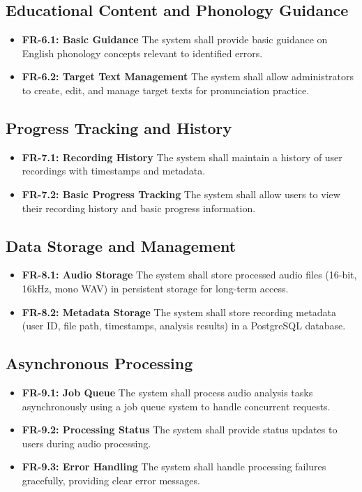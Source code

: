 \documentclass[a4paper,12pt]{report}
\begin{document}
\subsection{Educational Content and Phonology Guidance}
\begin{itemize}
    \item \textbf{FR-6.1: Basic Guidance} The system shall provide basic guidance on English phonology concepts relevant to identified errors.
    \item \textbf{FR-6.2: Target Text Management} The system shall allow administrators to create, edit, and manage target texts for pronunciation practice.
\end{itemize}

\subsection{Progress Tracking and History}
\begin{itemize}
    \item \textbf{FR-7.1: Recording History} The system shall maintain a history of user recordings with timestamps and metadata.
    \item \textbf{FR-7.2: Basic Progress Tracking} The system shall allow users to view their recording history and basic progress information.
\end{itemize}

\subsection{Data Storage and Management}
\begin{itemize}
    \item \textbf{FR-8.1: Audio Storage} The system shall store processed audio files (16-bit, 16kHz, mono WAV) in persistent storage for long-term access.
    \item \textbf{FR-8.2: Metadata Storage} The system shall store recording metadata (user ID, file path, timestamps, analysis results) in a PostgreSQL database.
\end{itemize}

\subsection{Asynchronous Processing}
\begin{itemize}
    \item \textbf{FR-9.1: Job Queue} The system shall process audio analysis tasks asynchronously using a job queue system to handle concurrent requests.
    \item \textbf{FR-9.2: Processing Status} The system shall provide status updates to users during audio processing.
    \item \textbf{FR-9.3: Error Handling} The system shall handle processing failures gracefully, providing clear error messages.
\end{itemize}
\end{document}
